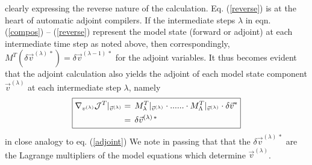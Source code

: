 %
clearly expressing the reverse nature of the calculation.
Eq. (\ref{reverse}) is at the heart of automatic adjoint compilers.
If the intermediate steps $\lambda$ in 
eqn. (\ref{compos}) -- (\ref{reverse})
represent the model state (forward or adjoint) at each 
intermediate time step as noted above, then correspondingly,
$ M^T (\delta \vec{v}^{(\lambda) \, \ast}) = 
\delta \vec{v}^{(\lambda-1) \, \ast} $ for the adjoint variables.
It thus becomes evident that the adjoint calculation also
yields the adjoint of each model state component 
$ \vec{v}^{(\lambda)} $ at each intermediate step $ \lambda $, namely
%
\begin{equation}
\boxed{
\begin{aligned}
\nabla_{v^{(\lambda)}} {\cal J}^T |_{\vec{v}^{(\lambda)}}
& = \,
M_{\lambda}^T |_{\vec{v}^{(\lambda)}} \cdot ...... \cdot 
M_{\Lambda}^T |_{\vec{v}^{(\lambda)}} \cdot \delta \vec{v}^{\ast} \\
~ & = \, \delta \vec{v}^{(\lambda) \, \ast}
\end{aligned}
}
\end{equation}
%
in close analogy to eq. (\ref{adjoint})
We note in passing that that the $\delta \vec{v}^{(\lambda) \, \ast}$
are the Lagrange multipliers of the model equations which determine
$ \vec{v}^{(\lambda)}$.

